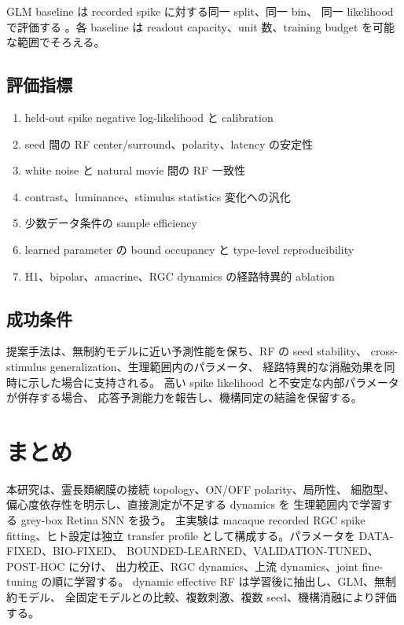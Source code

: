 \documentclass[a4paper,10pt,twocolumn,uplatex,dvipdfmx]{jsarticle}
\begin{document}
GLM baseline は recorded spike に対する同一 split、同一 bin、
同一 likelihood で評価する \cite{pillow2008}。各 baseline は
readout capacity、unit 数、training budget を可能な範囲でそろえる。

\subsection{評価指標}

\begin{enumerate}
  \item held-out spike negative log-likelihood と calibration
  \item seed 間の RF center/surround、polarity、latency の安定性
  \item white noise と natural movie 間の RF 一致性
  \item contrast、luminance、stimulus statistics 変化への汎化
  \item 少数データ条件の sample efficiency
  \item learned parameter の bound occupancy と type-level reproducibility
  \item H1、bipolar、amacrine、RGC dynamics の経路特異的 ablation
\end{enumerate}

\subsection{成功条件}

提案手法は、無制約モデルに近い予測性能を保ち、RF の seed stability、
cross-stimulus generalization、生理範囲内のパラメータ、
経路特異的な消融効果を同時に示した場合に支持される。
高い spike likelihood と不安定な内部パラメータが併存する場合、
応答予測能力を報告し、機構同定の結論を保留する。


\section{まとめ}

本研究は、霊長類網膜の接続 topology、ON/OFF polarity、局所性、
細胞型、偏心度依存性を明示し、直接測定が不足する dynamics を
生理範囲内で学習する grey-box Retina SNN を扱う。
主実験は macaque recorded RGC spike fitting、ヒト設定は独立 transfer profile
として構成する。パラメータを DATA-FIXED、BIO-FIXED、
BOUNDED-LEARNED、VALIDATION-TUNED、POST-HOC に分け、
出力校正、RGC dynamics、上流 dynamics、joint fine-tuning の順に学習する。
dynamic effective RF は学習後に抽出し、GLM、無制約モデル、
全固定モデルとの比較、複数刺激、複数 seed、機構消融により評価する。
\end{document}
